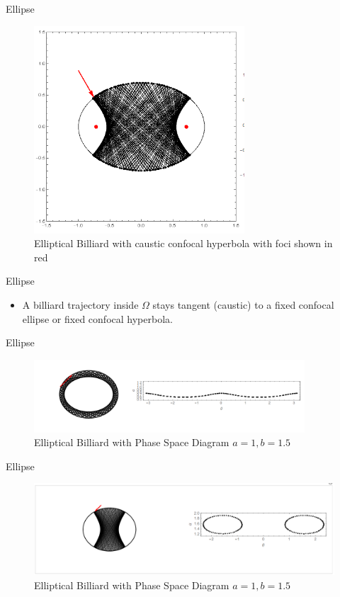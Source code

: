 \documentclass{beamer}
\begin{document}
\begin{frame}{Ellipse}
  \begin{figure}
    \centering
    \includegraphics[width = 0.7\textwidth]{ConfocalHyperbola}
    \caption{Elliptical Billiard with caustic confocal hyperbola with foci shown in red}
  \end{figure}
\end{frame}

\begin{frame}{Ellipse}
  \begin{itemize}
  \item
    A billiard trajectory inside $\Omega$ stays tangent (caustic) to a fixed confocal ellipse or fixed confocal hyperbola.
  \end{itemize}
\end{frame}

\begin{frame}{Ellipse}
  \begin{figure}
    \centering
    \includegraphics[width = 0.9\textwidth]{EllipsePhaseSpace}
    \caption{Elliptical Billiard with Phase Space Diagram $a = 1, b = 1.5$}
  \end{figure}
\end{frame}

\begin{frame}{Ellipse}
  \begin{figure}
    \centering
    \includegraphics[width = 1\textwidth]{EllipsePhaseSpace3}
    \caption{Elliptical Billiard with Phase Space Diagram $a = 1, b = 1.5$}
  \end{figure}
\end{frame}
\end{document}
